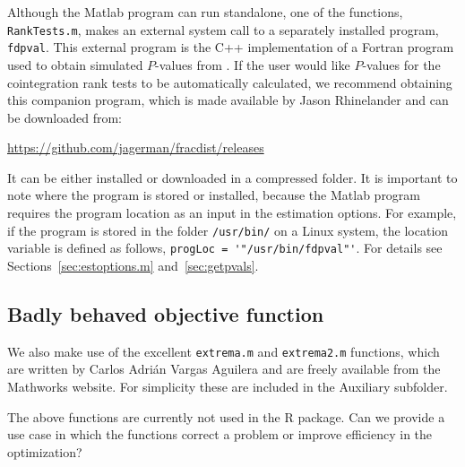 \documentclass[article]{jss}
\begin{document}
Although the Matlab program can run standalone, one of the functions, \verb|RankTests.m|, makes an external system call to a separately installed program, \verb|fdpval|. This external program is the C++ implementation of a Fortran program used to obtain simulated $P$-values from \cite{mackinnon2014numerical}. If the user would like $P$-values for the cointegration rank tests to be automatically calculated, we recommend obtaining this companion program, which is made available by Jason Rhinelander and can be downloaded from: 
\begin{center} \url{https://github.com/jagerman/fracdist/releases}
\end{center}
It can be either installed or downloaded in a compressed folder. It is important to note where the program is stored or installed, because the Matlab program requires the program location as an input in the estimation options. For example, if the program is stored in the folder \verb|/usr/bin/| on a Linux system, the location variable is defined as follows, \verb|progLoc = '"/usr/bin/fdpval"'|. For details see Sections~\ref{sec:estoptions.m} and~\ref{sec:getpvals}.

\subsection{Badly behaved objective function}

We also make use of the excellent \verb|extrema.m| and \verb|extrema2.m| functions, which are written by Carlos Adrián Vargas Aguilera and are freely available from the Mathworks website. For simplicity these are included in the Auxiliary subfolder.

\begin{leftbar}
The above functions are currently not used in the R package. 
Can we provide a use case in which the functions correct a problem or improve efficiency in the optimization?
\end{leftbar}
\end{document}
